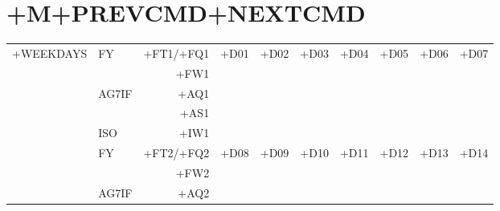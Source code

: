 \chapter*{\textbf{+M}\hfill{\footnotesize+PREVCMD+NEXTCMD}}
\begin{center}
{\ttfamily%
\begin{tabular}{|c|lr|c|c|c|c|c|c|c|}
\hline
    +WEEKDAYS
\hline
    \multirow{5}{0.5in}{} & FY    & +FT1/+FQ1 & \multirow[t]{5}{1in}{+D01} & \multirow[t]{5}{1in}{+D02} & \multirow[t]{5}{1in}{+D03} & \multirow[t]{5}{1in}{+D04} & \multirow[t]{5}{1in}{+D05} & \multirow[t]{5}{1in}{+D06} & \multirow[t]{5}{1in}{+D07} \\
                        &       &      +FW1 &                            &                            &                            &                            &                            &                            &                            \\
                        & AG7IF &      +AQ1 &                            &                            &                            &                            &                            &                            &                            \\
                        &       &      +AS1 &                            &                            &                            &                            &                            &                            &                            \\
                        & ISO   &      +IW1 &                            &                            &                            &                            &                            &                            &                            \\
\hline
    \multirow{5}{0.5in}{} & FY    & +FT2/+FQ2 & \multirow[t]{5}{1in}{+D08} & \multirow[t]{5}{1in}{+D09} & \multirow[t]{5}{1in}{+D10} & \multirow[t]{5}{1in}{+D11} & \multirow[t]{5}{1in}{+D12} & \multirow[t]{5}{1in}{+D13} & \multirow[t]{5}{1in}{+D14} \\
                        &       &      +FW2 &                            &                            &                            &                            &                            &                            &                            \\
                        & AG7IF &      +AQ2 &                            &                            &                            &                            &                            &                            &                            \\

\end{tabular}}
\end{center}
